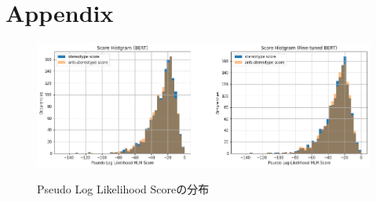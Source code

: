 \documentclass[
  platex, dvipdfmx %
]{nlp2021}
\begin{document}
\clearpage






\clearpage
\appendix
\onecolumn
\section{Appendix}

\begin{figure}[h]
\centering
\caption{Pseudo Log Likelihood Scoreの分布}
\includegraphics[width=15cm]{hist_pseudo_log_likelihood.png}
\label{fig:hist_log_likelihoods}
\end{figure}
\end{document}
